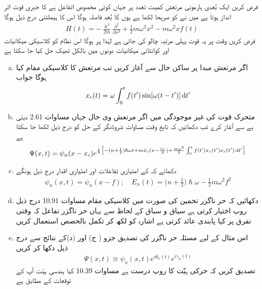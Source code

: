 فرض کریں ایک بُعدی ہارمونی مرتعش کمیت  تعدد  پر  جہاں  کوئی مخصوص اتفاعل ہے کا جبری قوت اثر انداز ہوتا ہے میں نے  کو صريحا لکھا ہے یوں  کا بُعد فاصلہ ہوگا اس کا ہیملٹنی درج ذیل ہوگا 
\begin{align}
H(t) = - \frac{\hslash^2}{2m} \frac{\partial^2}{\partial x^2} + \frac{1}{2} m \omega^2 x^2 - m \omega^2 x f (t)
\end{align}
فرض کریں وقت  پر یہ قوت پہلی مرتبہ چالو کی جاتی ہے لہٰذا  پر  ہوگا اس نظام کو کلاسیکی میکانیات اور کوانٹائی میکانیات دونوں میں بالکل ٹھیک حل کیا جا سکتا ہے 
\begin{enumerate}[a.]
\item
اگر مرتعش مبدا پر ساکن حال  سے آغاز کریں تب مرتعش کا کلاسیکی مقام کیا ہوگا جواب 
\begin{align}
x_c (t) = \omega \int_0^{t} f(t') \sin [\omega (t - t')] \dif t'
\end{align}
\item
متحرک قوت کی غیر موجودگی میں اگر مرتعش  وی حال  جہاں  مساوات 2.61 دیتی ہے سے آغاز کرے تب دکھائیں کہ تابع وقت مساوات شروڈنگر کے حل کو درج ذیل لکھا جا سکتا ہے 
\begin{align}
\Psi (x, t) = \psi_n (x - x_c) e^{\frac{i}{\hslash} \big[- (n + \frac{1}{2}) \hslash \omega t + m \dot{x}_c (x - \frac{x_c}{2}) + \frac{m \omega^2}{2} \int_0^t f (t') x_c (t') x_c (t') \dif t'\big]}
\end{align}
\item
دکھائے کہ  کے امتیازی تفاعلات اور امتیازی اقدار درج ذیل ہونگے 
\begin{align}
\psi_n (x, t) = \psi_n (x - f); \quad E_n (t) = \big ( n + \frac{1}{2} \big ) \hslash \omega - \frac{1}{2} m \omega^2 f^2
\end{align}
\item
دکھائیں کہ حر ناگزر تخمین کی صورت میں کلاسیکی مقام مساوات 10.91 درج ذیل روپ اختیار کرتی ہے  سیاق و سباق کے لحاظ سے یہاں حر ناگزر تفاعل  کہ وقتی تفرق پر کیا پابندی عائد کرتی ہے اشارہ  کو  لکھ کر تکمل بالحصص استعمال کریں 
\item
اس مثال کے لیے مسئلہ حر ناگزر کی تصدیق جزو ( ج) اور (د)کے نتائج سے درج ذیل دکھا کر کریں 
\begin{align}
\Psi (x, t) \cong \psi_n (x, t) e^{i \theta_n (t)} e^{i \gamma_n (t)}
\end{align}
تصدیق کریں  کہ حرکی ہیّت کا روپ درست ہے مساوات 10.39 کیا ہندسی ہیّت آپ کے توقعات کے مطابق ہے  
\end{enumerate}

